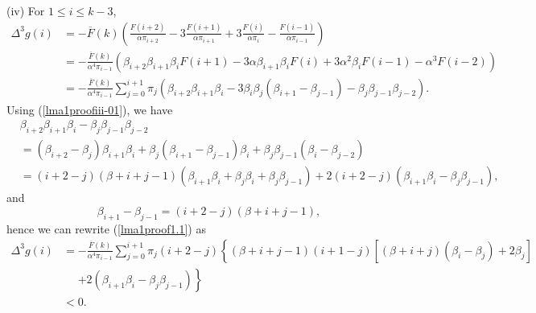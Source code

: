 \documentclass[12pt]{article}
\def\Ref#1{(\ref{#1})}
\newcommand{\oF}{{\overline{F}}}
\numberwithin{equation}{section}
\begin{document}
(iv) For $1\le i\le k-3$,
 \begin{align}\Delta^3 g(i)&=-\oF(k)\left(\frac{F(i+2)}{\alpha\pi_{i+2}}-3\frac{F(i+1)}{\alpha\pi_{i+1}}+3\frac{F(i)}{\alpha\pi_i}-\frac{F(i-1)}{\alpha\pi_{i-1}}\right)\nonumber\\
 &=-\frac{\oF(k)}{\alpha^4\pi_{i-1}}\left(\beta_{i+2}\beta_{i+1}\beta_iF(i+1)-3\alpha\beta_{i+1}\beta_iF(i)+3\alpha^2\beta_iF(i-1)-\alpha^3F(i-2)\right)\nonumber\\
 &=-\frac{\oF(k)}{\alpha^4\pi_{i-1}}\sum_{j=0}^{i+1}\pi_j\left(\beta_{i+2}\beta_{i+1}\beta_i-3\beta_i\beta_j(\beta_{i+1}-\beta_{j-1})-\beta_j\beta_{j-1}\beta_{j-2}\right).\label{lma1proof1.1}
 \end{align}
 Using \Ref{lma1proofiii-01},
 we have
 \begin{align*}
 &\beta_{i+2}\beta_{i+1}\beta_i-\beta_j\beta_{j-1}\beta_{j-2}\nonumber\\
 &=(\beta_{i+2}-\beta_j)\beta_{i+1}\beta_i+\beta_j(\beta_{i+1}-\beta_{j-1})\beta_i+\beta_j\beta_{j-1}(\beta_i-\beta_{j-2})\nonumber\\
 &=(i+2-j)(\beta+i+j-1)(\beta_{i+1}\beta_i+\beta_j\beta_i+\beta_j\beta_{j-1})+2(i+2-j)(\beta_{i+1}\beta_i-\beta_j\beta_{j-1}),
 \end{align*}
 and
 $$\beta_{i+1}-\beta_{j-1}=(i+2-j)(\beta+i+j-1),%
$$
 hence we can rewrite \Ref{lma1proof1.1} as 
 \begin{align*}
 \Delta^3 g(i)&=-\frac{\oF(k)}{\alpha^4\pi_{i-1}}\sum_{j=0}^{i+1}\pi_j(i+2-j)\left\{(\beta+i+j-1)(i+1-j)[(\beta+i+j)(\beta_i-\beta_j)+2\beta_j]\right.\nonumber\\
 &\ \ \ \ \ \ \left.+2(\beta_{i+1}\beta_i-\beta_j\beta_{j-1})\right\}\nonumber\\
 &<0.
\end{align*}
\end{document}
